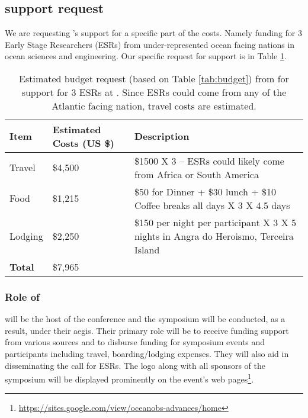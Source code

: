 \subsection{\nsf support request}

We are requesting \nsfe's support for a specific part of the \symp
costs. Namely funding for 3 Early Stage Researchers (ESRs) from
under-represented ocean facing nations in ocean sciences and
engineering. Our specific request for \nsf support is in Table
\ref{tab:esr-budget}.

\begin{table}[!h]
  \footnotesize{
    \centering    
    \begin{tabular}{|p{3.5cm}|p{1.6cm}|p{10cm}|}
    \hline 
    \rowcolor{Gray}
    \bfseries Item& \bfseries Estimated Costs (US \$)&\bfseries Description\\
    \hline
      Travel& \$4,500 & \$1500 X 3 -- ESRs could likely come from Africa or South America\\
    \hline
      Food& \$1,215 & \$50 for Dinner + \$30 lunch + \$10 Coffee breaks all days X 3 X 4.5 days\\
    \hline
      Lodging& \$2,250 & \$150 per night per participant X 3 X 5 nights in Angra do Heroismo, Terceira Island\\
    \hline
    \textbf{Total}& \$7,965 &\\
    \hline        
  \end{tabular}
  \caption{Estimated budget request (based on Table \ref{tab:budget})
    from \nsf for support for 3 ESRs at \sympe. Since ESRs could come
    from any of the Atlantic facing nation, travel costs are estimated.}
  \label{tab:esr-budget}
}
\end{table}


\subsubsection{Role of \air}

\air will be the host of the conference and the symposium will be
conducted, as a result, under their aegis. Their primary role will be
to receive funding support from various sources and to disburse
funding for symposium events and participants including travel,
boarding/lodging expenses. They will also aid in disseminating the
call for ESRs. The \air logo along with all sponsors of the symposium
will be displayed prominently on the event's web
pages\footnote{\url{https://sites.google.com/view/oceanobs-advances/home}}.
